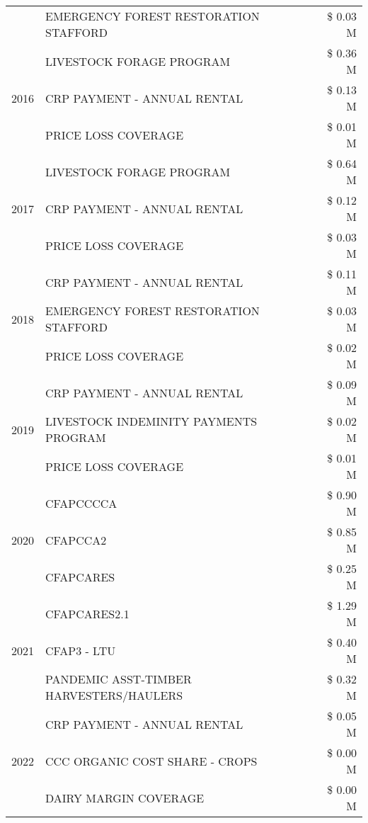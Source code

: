 \begin{tabular}{llr}
 & EMERGENCY FOREST RESTORATION STAFFORD & \$ 0.03 M \\
\cline{1-3}
\multirow[t]{3}{*}{2016} & LIVESTOCK FORAGE PROGRAM & \$ 0.36 M \\
 & CRP PAYMENT - ANNUAL RENTAL & \$ 0.13 M \\
 & PRICE LOSS COVERAGE & \$ 0.01 M \\
\cline{1-3}
\multirow[t]{3}{*}{2017} & LIVESTOCK FORAGE PROGRAM & \$ 0.64 M \\
 & CRP PAYMENT - ANNUAL RENTAL & \$ 0.12 M \\
 & PRICE LOSS COVERAGE & \$ 0.03 M \\
\cline{1-3}
\multirow[t]{3}{*}{2018} & CRP PAYMENT - ANNUAL RENTAL & \$ 0.11 M \\
 & EMERGENCY FOREST RESTORATION STAFFORD & \$ 0.03 M \\
 & PRICE LOSS COVERAGE & \$ 0.02 M \\
\cline{1-3}
\multirow[t]{3}{*}{2019} & CRP PAYMENT - ANNUAL RENTAL & \$ 0.09 M \\
 & LIVESTOCK INDEMINITY PAYMENTS PROGRAM & \$ 0.02 M \\
 & PRICE LOSS COVERAGE & \$ 0.01 M \\
\cline{1-3}
\multirow[t]{3}{*}{2020} & CFAPCCCCA & \$ 0.90 M \\
 & CFAPCCA2 & \$ 0.85 M \\
 & CFAPCARES & \$ 0.25 M \\
\cline{1-3}
\multirow[t]{3}{*}{2021} & CFAPCARES2.1 & \$ 1.29 M \\
 & CFAP3 - LTU & \$ 0.40 M \\
 & PANDEMIC ASST-TIMBER HARVESTERS/HAULERS & \$ 0.32 M \\
\cline{1-3}
\multirow[t]{3}{*}{2022} & CRP PAYMENT - ANNUAL RENTAL & \$ 0.05 M \\
 & CCC ORGANIC COST SHARE - CROPS & \$ 0.00 M \\
 & DAIRY MARGIN COVERAGE & \$ 0.00 M \\
\cline{1-3}
\bottomrule
\end{tabular}
